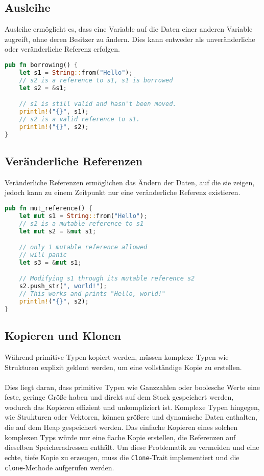 \subsection{Ausleihe}
Ausleihe ermöglicht es, dass eine Variable auf die Daten einer anderen Variable zugreift, ohne deren Besitzer zu ändern. Dies kann entweder als unveränderliche oder veränderliche Referenz erfolgen.

\begin{lstlisting}[language=Rust, caption=Unveränderliche Ausleihe Beispiel]
pub fn borrowing() {
    let s1 = String::from("Hello");
    // s2 is a reference to s1, s1 is borrowed
    let s2 = &s1;  

    // s1 is still valid and hasn't been moved.
    println!("{}", s1); 
    // s2 is a valid reference to s1.
    println!("{}", s2); 
}
\end{lstlisting}

\subsection{Veränderliche Referenzen}
Veränderliche Referenzen ermöglichen das Ändern der Daten, auf die sie zeigen, jedoch kann zu einem Zeitpunkt nur eine veränderliche Referenz existieren.

\begin{lstlisting}[language=Rust, caption=Veränderliche Referenz Beispiel]
pub fn mut_reference() {
    let mut s1 = String::from("Hello");
    // s2 is a mutable reference to s1
    let mut s2 = &mut s1;  

    // only 1 mutable reference allowed
    // will panic
    let s3 = &mut s1;

    // Modifying s1 through its mutable reference s2
    s2.push_str(", world!"); 
    // This works and prints "Hello, world!"
    println!("{}", s2); 
}
\end{lstlisting}
\cleardoublepage
\subsection{Kopieren und Klonen}
Während primitive Typen kopiert werden, müssen komplexe Typen wie Strukturen explizit geklont werden, um eine vollständige Kopie zu erstellen.\\
\\
Dies liegt daran, dass primitive Typen wie Ganzzahlen oder boolesche Werte eine feste, geringe Größe haben und direkt auf dem Stack gespeichert werden, wodurch das Kopieren effizient und unkompliziert ist. 
Komplexe Typen hingegen, wie Strukturen oder Vektoren, können größere und dynamische Daten enthalten, die auf dem Heap gespeichert werden. 
Das einfache Kopieren eines solchen komplexen Typs würde nur eine flache Kopie erstellen, die Referenzen auf dieselben Speicheradressen enthält. 
Um diese Problematik zu vermeiden und eine echte, tiefe Kopie zu erzeugen, muss die \texttt{Clone}-Trait implementiert und die \texttt{clone}-Methode aufgerufen werden.

